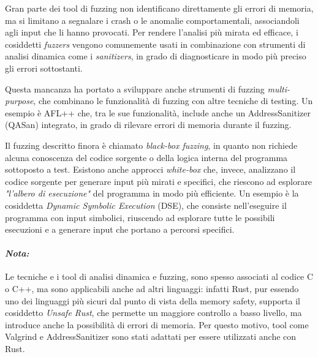 Gran parte dei tool di fuzzing non identificano direttamente gli errori di
memoria, ma si limitano a segnalare i crash o le anomalie comportamentali,
associandoli agli input che li hanno provocati. Per rendere l'analisi più mirata
ed efficace, i cosiddetti \textit{fuzzers} vengono comunemente usati in combinazione
con strumenti di analisi dinamica come i \textit{sanitizers}, in grado di diagnosticare
in modo più preciso gli errori sottostanti.

Questa mancanza ha portato a sviluppare anche strumenti di fuzzing \textit{multi-purpose},
che combinano le funzionalità di fuzzing con altre tecniche di testing. Un
esempio è AFL++\cite{afl_plus_plus} che, tra le sue funzionalità, include anche un
AddressSanitizer (QASan\cite{qasan}) integrato, in grado di rilevare errori di memoria
durante il fuzzing.

Il fuzzing descritto finora è chiamato \textit{black-box fuzzing}, in quanto non
richiede alcuna conoscenza del codice sorgente o della logica interna del programma
sottoposto a test. Esistono anche approcci \textit{white-box} che, invece, analizzano
il codice sorgente per generare input più mirati e specifici, che riescono ad
esplorare \textit{"l'albero di esecuzione"} del programma in modo più efficiente.
Un esempio è la cosiddetta \textit{Dynamic Symbolic Execution} (DSE), che
consiste nell'eseguire il programma con input simbolici, riuscendo ad esplorare tutte
le possibili esecuzioni e a generare input che portano a percorsi specifici.

\noindent

\paragraph{\textit{Nota:}}
Le tecniche e i tool di analisi dinamica e fuzzing, sono spesso associati al
codice C o C++, ma sono applicabili anche ad altri linguaggi: infatti Rust, pur essendo
uno dei linguaggi più sicuri dal punto di vista della memory safety, supporta il
cosiddetto \textit{Unsafe Rust}, che permette un maggiore controllo a basso
livello, ma introduce anche la possibilità di errori di memoria. Per questo
motivo, tool come Valgrind e AddressSanitizer sono stati adattati per essere utilizzati
anche con Rust.\cite{valgrind_rust}\cite{rust_manual_san}